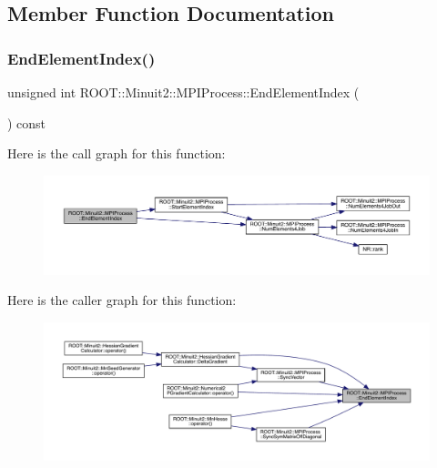 \subsection{Member Function Documentation}
\mbox{\label{classROOT_1_1Minuit2_1_1MPIProcess_af4445148831dec4961d5f8aa99aeb2c1}} 
\subsubsection{\texorpdfstring{EndElementIndex()}{EndElementIndex()}\hspace{0.1cm}{\footnotesize\ttfamily [1/3]}}
{\footnotesize\ttfamily unsigned int R\+O\+O\+T\+::\+Minuit2\+::\+M\+P\+I\+Process\+::\+End\+Element\+Index (\begin{DoxyParamCaption}{ }\end{DoxyParamCaption}) const\hspace{0.3cm}{\ttfamily [inline]}}

Here is the call graph for this function\+:
\nopagebreak
\begin{figure}[H]
\begin{center}
\leavevmode
\includegraphics[width=350pt]{dc/d43/classROOT_1_1Minuit2_1_1MPIProcess_af4445148831dec4961d5f8aa99aeb2c1_cgraph}
\end{center}
\end{figure}
Here is the caller graph for this function\+:
\nopagebreak
\begin{figure}[H]
\begin{center}
\leavevmode
\includegraphics[width=350pt]{dc/d43/classROOT_1_1Minuit2_1_1MPIProcess_af4445148831dec4961d5f8aa99aeb2c1_icgraph}
\end{center}
\end{figure}
\mbox{\label{classROOT_1_1Minuit2_1_1MPIProcess_af4445148831dec4961d5f8aa99aeb2c1}} 
